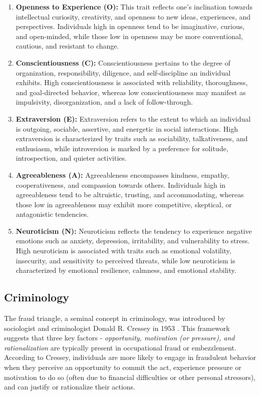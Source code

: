 \begin{enumerate}
    \item \textbf{Openness to Experience (O):} This trait reflects one's inclination towards intellectual curiosity, creativity, and openness to new ideas, experiences, and perspectives. Individuals high in openness tend to be imaginative, curious, and open-minded, while those low in openness may be more conventional, cautious, and resistant to change.
    \item \textbf{Conscientiousness (C):} Conscientiousness pertains to the degree of organization, responsibility, diligence, and self-discipline an individual exhibits. High conscientiousness is associated with reliability, thoroughness, and goal-directed behavior, whereas low conscientiousness may manifest as impulsivity, disorganization, and a lack of follow-through.
    \item \textbf{Extraversion (E):} Extraversion refers to the extent to which an individual is outgoing, sociable, assertive, and energetic in social interactions. High extraversion is characterized by traits such as sociability, talkativeness, and enthusiasm, while introversion is marked by a preference for solitude, introspection, and quieter activities.
    \item \textbf{Agreeableness (A):} Agreeableness encompasses kindness, empathy, cooperativeness, and compassion towards others. Individuals high in agreeableness tend to be altruistic, trusting, and accommodating, whereas those low in agreeableness may exhibit more competitive, skeptical, or antagonistic tendencies.
    \item \textbf{Neuroticism (N):} Neuroticism reflects the tendency to experience negative emotions such as anxiety, depression, irritability, and vulnerability to stress. High neuroticism is associated with traits such as emotional volatility, insecurity, and sensitivity to perceived threats, while low neuroticism is characterized by emotional resilience, calmness, and emotional stability.
\end{enumerate}

\subsection{Criminology}
The fraud triangle, a seminal concept in criminology, was introduced by sociologist and criminologist Donald R. Cressey in 1953 \cite{Cressey}. This framework suggests that three key factors - \textit{opportunity, motivation (or pressure), and rationalization} are typically present in occupational fraud or embezzlement. According to Cressey, individuals are more likely to engage in fraudulent behavior when they perceive an opportunity to commit the act, experience pressure or motivation to do so (often due to financial difficulties or other personal stressors), and can justify or rationalize their actions. 

